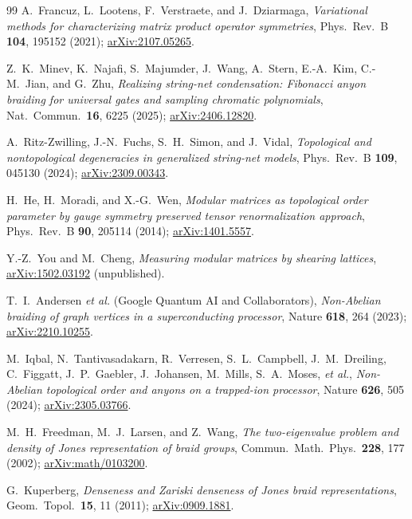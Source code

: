\documentclass[aps,pra,twocolumn,superscriptaddress,longbibliography,floatfix,nofootinbib]{revtex4-2}
\begin{document}
\begin{thebibliography}{99}
A.~Francuz, L.~Lootens, F.~Verstraete, and J.~Dziarmaga,
\emph{Variational methods for characterizing matrix product operator
symmetries},
Phys.\ Rev.\ B \textbf{104}, 195152 (2021);
\href{https://arxiv.org/abs/2107.05265}{arXiv:2107.05265}.

Z.~K.~Minev, K.~Najafi, S.~Majumder, J.~Wang, A.~Stern, E.-A.~Kim, C.-M.~Jian,
and G.~Zhu,
\emph{Realizing string-net condensation: Fibonacci anyon braiding for universal
gates and sampling chromatic polynomials},
Nat.\ Commun.\ \textbf{16}, 6225 (2025);
\href{https://arxiv.org/abs/2406.12820}{arXiv:2406.12820}.

A.~Ritz-Zwilling, J.-N.~Fuchs, S.~H.~Simon, and J.~Vidal,
\emph{Topological and nontopological degeneracies in generalized string-net
models},
Phys.\ Rev.\ B \textbf{109}, 045130 (2024);
\href{https://arxiv.org/abs/2309.00343}{arXiv:2309.00343}.

H.~He, H.~Moradi, and X.-G.~Wen,
\emph{Modular matrices as topological order parameter by gauge symmetry
preserved tensor renormalization approach},
Phys.\ Rev.\ B \textbf{90}, 205114 (2014);
\href{https://arxiv.org/abs/1401.5557}{arXiv:1401.5557}.

Y.-Z.~You and M.~Cheng,
\emph{Measuring modular matrices by shearing lattices},
\href{https://arxiv.org/abs/1502.03192}{arXiv:1502.03192} (unpublished).

T.~I.~Andersen \emph{et al.} (Google Quantum AI and Collaborators),
\emph{Non-Abelian braiding of graph vertices in a superconducting processor},
Nature \textbf{618}, 264 (2023);
\href{https://arxiv.org/abs/2210.10255}{arXiv:2210.10255}.

M.~Iqbal, N.~Tantivasadakarn, R.~Verresen, S.~L.~Campbell, J.~M.~Dreiling,
C.~Figgatt, J.~P.~Gaebler, J.~Johansen, M.~Mills, S.~A.~Moses, \emph{et al.},
\emph{Non-Abelian topological order and anyons on a trapped-ion processor},
Nature \textbf{626}, 505 (2024);
\href{https://arxiv.org/abs/2305.03766}{arXiv:2305.03766}.

M.~H.~Freedman, M.~J.~Larsen, and Z.~Wang,
\emph{The two-eigenvalue problem and density of Jones representation of braid
groups},
Commun.\ Math.\ Phys.\ \textbf{228}, 177 (2002);
\href{https://arxiv.org/abs/math/0103200}{arXiv:math/0103200}.

G.~Kuperberg,
\emph{Denseness and Zariski denseness of Jones braid representations},
Geom.\ Topol.\ \textbf{15}, 11 (2011);
\href{https://arxiv.org/abs/0909.1881}{arXiv:0909.1881}.

\end{thebibliography}
\end{document}
